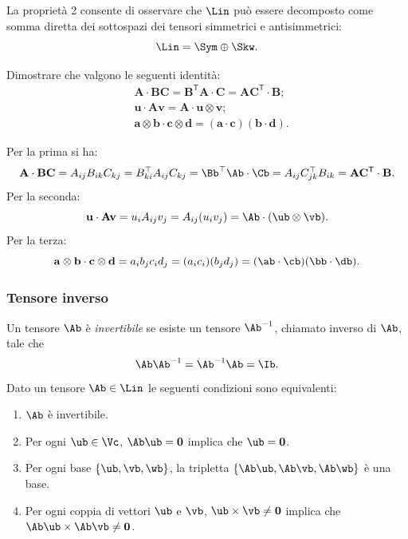La proprietà 2 consente di osservare che $\Lin$ può essere decomposto come somma diretta dei sottospazi dei tensori simmetrici e antisimmetrici:
\begin{equation}
	\Lin = \Sym \oplus \Skw. 
\end{equation}

\begin{exercise}
Dimostrare che valgono le seguenti identità:
\begin{equation}
	\begin{aligned}
		&\mathbf{A}\cdot\mathbf{B}\mathbf{C}=\mathbf{B}^\mathsf{T}\mathbf{A}\cdot\mathbf{C}=\mathbf{A}\mathbf{C}^\mathsf{T}\cdot\mathbf{B}; \\
		&\mathbf{u}\cdot\mathbf{A}\mathbf{v}=\mathbf{A}\cdot\mathbf{u}\otimes\mathbf{v}; \\
		&\mathbf{a\otimes b\cdot c\otimes d=(a\cdot c)(b\cdot d).}
	\end{aligned}
\end{equation}
\begin{svolgimento}
Per la prima si ha:
\begin{equation}
\mathbf{A}\cdot\mathbf{B}\mathbf{C}=A_{ij}B_{ik}C_{kj}=B^\top_{ki}A_{ij}C_{kj}=\Bb ^\top \Ab \cdot \Cb =A_{ij}C^\top_{jk}B_{ik}=\mathbf{A}\mathbf{C}^\mathsf{T}\cdot\mathbf{B}.
\end{equation}
Per la seconda:
\begin{equation}
	\mathbf{u}\cdot\mathbf{A}\mathbf{v}=u_i A_{ij}v_j=A_{ij}(u_iv_j)=\Ab \cdot(\ub \otimes \vb).
\end{equation}
Per la terza:
\begin{equation}
\mathbf{a\otimes b\cdot c\otimes d}=a_i b_j c_i d_j=(a_i c_i)(b_j d_j)=(\ab\cdot \cb)(\bb\cdot \db).
\end{equation}
\end{svolgimento}
\end{exercise}
 


\subsubsection{Tensore inverso}
Un tensore $\Ab$ è \textit{invertibile} se esiste un tensore $\Ab ^{-1}$, chiamato inverso di $\Ab$, tale che
\begin{equation}
	\Ab \Ab ^{-1}=\Ab ^{-1}\Ab =\Ib.
\end{equation} 
Dato un tensore $\Ab \in \Lin$ le seguenti condizioni sono equivalenti:
\begin{enumerate}
	\item $\Ab$ è invertibile.
	\item Per ogni $\ub \in \Vc$, $\Ab \ub=\mathbf{0} $ implica che $\ub = \mathbf{0}$.
	\item Per ogni base $\{ \ub, \vb, \wb \}$, la tripletta $\{\Ab \ub, \Ab \vb, \Ab \wb\}$ è una base.
	\item Per ogni coppia di vettori $\ub$ e $\vb$, $\ub \times \vb \neq \mathbf{0}$ implica che $\Ab\ub \times \Ab\vb\neq \mathbf{0}$.
\end{enumerate}


